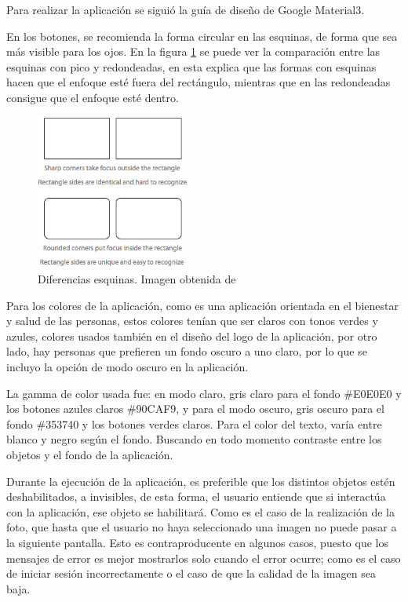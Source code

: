 Para realizar la aplicación se siguió la guía de diseño de Google Material3.

En los botones, se recomienda la forma circular en las esquinas, de forma que sea más visible para los ojos. En la figura \ref{fig:EsquinasRedondeadas} se puede ver la comparación entre las esquinas con pico y redondeadas, en esta explica que las formas con esquinas hacen que el enfoque esté fuera del rectángulo, mientras que en las redondeadas consigue que el enfoque esté dentro.
        \begin{figure}[!ht]
                 \centering
                 \includegraphics[width=0.45\textwidth]{img/rounded-corners.png}
                  \caption{Diferencias esquinas. Imagen obtenida de~\cite{rounded-corners-uxmovement}}
                 \label{fig:EsquinasRedondeadas}
        \end{figure}

Para los colores de la aplicación, como es una aplicación orientada en el bienestar y salud de las personas, estos colores tenían que ser claros con tonos verdes y azules, colores usados también en el diseño del logo de la aplicación, por otro lado, hay personas que prefieren un fondo oscuro a uno claro, por lo que se incluyo la opción de modo oscuro en la aplicación.

La gamma de color usada fue: en modo claro, gris claro para el fondo \#E0E0E0 y los botones azules claros \#90CAF9,  y para el modo oscuro, gris oscuro para el fondo \#353740 y los botones verdes claros.
Para el color del texto, varía entre blanco y negro según el fondo. Buscando en todo momento contraste  entre los objetos y el fondo de la aplicación.

Durante la ejecución de la aplicación, es preferible que los distintos objetos estén deshabilitados, a invisibles, de esta forma, el usuario entiende que si interactúa con la aplicación, ese objeto se habilitará. Como es el caso de la realización de la foto, que hasta que el usuario no haya seleccionado una imagen no puede pasar a la siguiente pantalla. Esto es contraproducente en algunos casos, puesto que los mensajes de error es mejor mostrarlos solo cuando el error ocurre; como es el caso de iniciar sesión incorrectamente o el caso de que la calidad de la imagen sea baja.